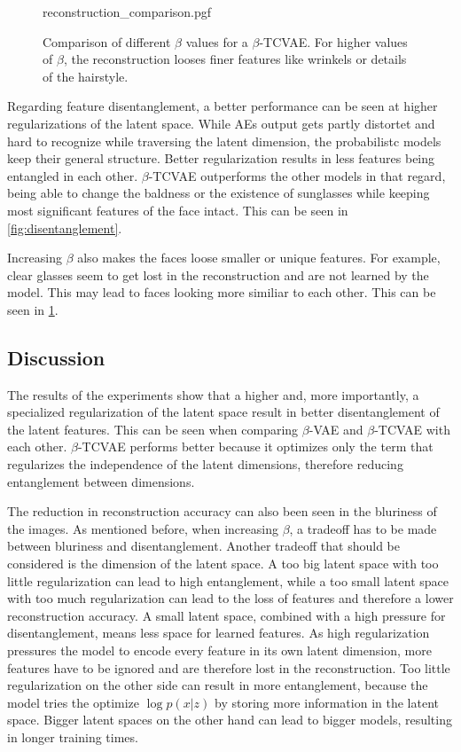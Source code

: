 \documentclass[a4paper]{IEEEtran}
\begin{document}
{\begin{figure}
	\centering
    {reconstruction_comparison.pgf}
    \caption{Comparison of different $\beta$ values for a $\beta$-TCVAE. For higher values of $\beta$, the reconstruction looses finer features like wrinkels or details of the hairstyle.}
    \label{fig:reconstruction}
\end{figure}

Regarding feature disentanglement, a better performance can be seen at higher regularizations of the latent space. While AEs output gets partly distortet and hard to recognize while traversing the latent dimension, the probabilistc models keep their general structure. Better regularization results in less features being entangled in each other. $\beta$-TCVAE outperforms the other models in that regard, being able to change the baldness or the existence of sunglasses while keeping most significant features of the face intact. This can be seen in \ref{fig:disentanglement}.

Increasing $\beta$ also makes the faces loose smaller or unique features. For example, clear glasses seem to get lost in the reconstruction and are not learned by the model. This may lead to faces looking more similiar to each other. This can be seen in \ref{fig:reconstruction}.

\subsection{Discussion}
The results of the experiments show that a higher and, more importantly, a specialized regularization of the latent space result in better disentanglement of the latent features. This can be seen when comparing $\beta$-VAE and $\beta$-TCVAE with each other. $\beta$-TCVAE performs better because it optimizes only the term that regularizes the independence of the latent dimensions, therefore reducing entanglement between dimensions.

The reduction in reconstruction accuracy can also been seen in the bluriness of the images. As mentioned before, when increasing $\beta$, a tradeoff has to be made between bluriness and disentanglement. Another tradeoff that should be considered is the dimension of the latent space. A too big latent space with too little regularization can lead to high entanglement, while a too small latent space with too much regularization can lead to the loss of features and therefore a lower reconstruction accuracy. A small latent space, combined with a high pressure for disentanglement, means less space for learned features. As high regularization pressures the model to encode every feature in its own latent dimension, more features have to be ignored and are therefore lost in the reconstruction. Too little regularization on the other side can result in more entanglement, because the model tries the optimize $\log p(x|z)$ by storing more information in the latent space. Bigger latent spaces on the other hand can lead to bigger models, resulting in longer training times.

}
\end{document}
